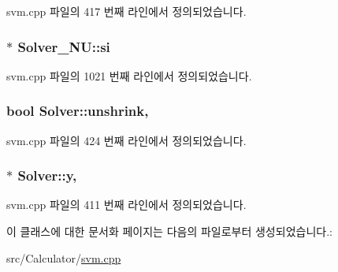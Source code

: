 svm.\+cpp 파일의 417 번째 라인에서 정의되었습니다.

\hypertarget{class_solver___n_u_ab4f51d421dfaec61482401ff5ef0d86c}{
\subsubsection[{si}]{$\ast$ Solver\+\_\+\+N\+U\+::si\hspace{0.3cm}{\ttfamily [private]}}}\label{class_solver___n_u_ab4f51d421dfaec61482401ff5ef0d86c}


svm.\+cpp 파일의 1021 번째 라인에서 정의되었습니다.

\hypertarget{class_solver_a62ded1c184aeb28f8dee04eb4a10530a}{
\subsubsection[{unshrink}]{\setlength{\rightskip}{0pt plus 5cm}bool Solver\+::unshrink\hspace{0.3cm}{\ttfamily [protected]}, {\ttfamily [inherited]}}}\label{class_solver_a62ded1c184aeb28f8dee04eb4a10530a}


svm.\+cpp 파일의 424 번째 라인에서 정의되었습니다.

\hypertarget{class_solver_a3acc1043d06dedf87f054ff3eea5c426}{
\subsubsection[{y}]{$\ast$ Solver\+::y\hspace{0.3cm}{\ttfamily [protected]}, {\ttfamily [inherited]}}}\label{class_solver_a3acc1043d06dedf87f054ff3eea5c426}


svm.\+cpp 파일의 411 번째 라인에서 정의되었습니다.



이 클래스에 대한 문서화 페이지는 다음의 파일로부터 생성되었습니다.\+:\begin{DoxyCompactItemize}
\item 
src/\+Calculator/\hyperlink{svm_8cpp}{svm.\+cpp}\end{DoxyCompactItemize}
